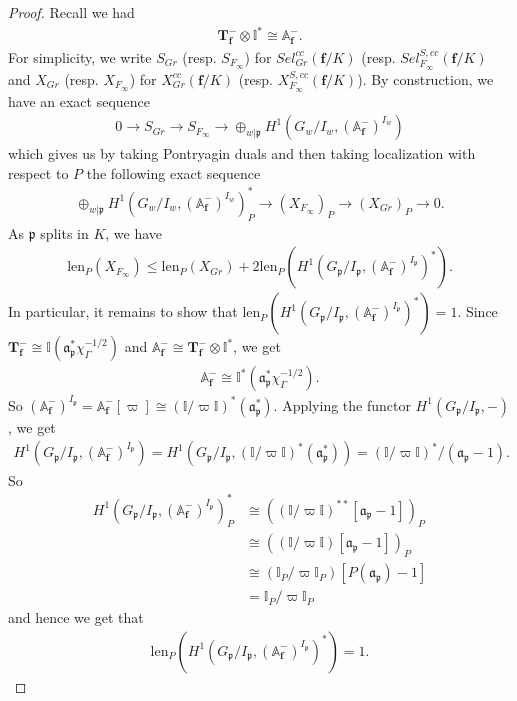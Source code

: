 \documentclass[reqno,10pt]{amsart}
\newcommand{\A}{\mathbb{A}}
\newcommand{\I}{\mathbb{I}}
\newcommand{\f}{\mathbf{f}}
\newcommand{\T}{\mathbf{T}}
\newcommand{\ma}{\mathfrak{a}}
\newcommand{\p}{\mathfrak{p}}
\newcommand{\vp}{\varpi}
\theoremstyle{plain}
\theoremstyle{definition}
\begin{document}
\begin{proof}
    Recall we had 
    \begin{align*}
        \T_\f^- \otimes \I^* \cong \mathbb{A}_\f^-.
    \end{align*}
    For simplicity, we write $S_{Gr}$ (resp. $S_{F_\infty}$) for $Sel^{cc}_{Gr}(\f/K)$ (resp. $Sel^{S,cc}_{F_\infty}(\f/K)$ and $X_{Gr}$ (resp. $X_{F_\infty}$) for $X^{cc}_{Gr}(\f/K)$ (resp. $X^{S,cc}_{F_\infty}(\f/K)$). By construction, we have an exact sequence 
    \begin{align*}
        0 \rightarrow S_{Gr} \rightarrow S_{F_\infty} \rightarrow \oplus_{w|\p} H^1(G_w/I_w,(\A_\f^-)^{I_w})
    \end{align*}
    which gives us by taking Pontryagin duals and then taking localization with respect to $P$ the following exact sequence
    \begin{align*}
        \oplus_{w|\p} H^1(G_w/I_w,(\A_\f^-)^{I_w})^*_P \rightarrow (X_{F_\infty})_P \rightarrow (X_{Gr})_P \rightarrow 0.
    \end{align*}
    As $\p$ splits in $K$, we have
    \begin{align*}
        \mathrm{len}_P(X_{F_\infty}) \leq \mathrm{len}_P(X_{Gr}) + 2\mathrm{len}_P(H^1(G_\p/I_\p,(\A_\f^-)^{I_\p})^*).
    \end{align*}
    In particular, it remains to show that $\mathrm{len}_P(H^1(G_\p/I_\p,(\A_\f^-)^{I_\p})^*) = 1$. 
    Since $\T_\f^- \cong \I(\ma_\p^* \chi_\Gamma^{-1/2})$ and $\A_\f^- \cong \T_\f^- \otimes \I^*$, we get
    \begin{align*}
        \A_\f^- \cong \I^*(\ma_\p^*\chi_\Gamma^{-1/2}).
    \end{align*}
    So $(\A_\f^-)^{I_\p} = \A_\f^-[\vp] \cong (\I/\vp\I)^*(\ma_\p^*)$. Applying the functor $H^1(G_\p/I_\p, -)$, we get
    \begin{align*}
        H^1(G_\p/I_\p,(\A_\f^-)^{I_\p}) = H^1(G_\p/I_\p,(\I/\vp\I)^*(\ma_\p^*)) = (\I/\vp\I)^*/(\ma_\p-1).
    \end{align*}
    So 
    \begin{align*}
        H^1(G_\p/I_\p,(\A_\f^-)^{I_\p})^*_P & \cong ((\I/\vp\I)^{**}[\ma_\p-1])_P \\
        & \cong ((\I/\vp\I)[\ma_\p-1])_P \\
        & \cong (\I_P/\vp\I_P)[P(\ma_\p) - 1] \\
        & = \I_P/\vp\I_P
    \end{align*}
    and hence we get that 
    \begin{align*}
        \mathrm{len}_P(H^1(G_\p/I_\p,(\A_\f^-)^{I_\p})^*) = 1.
    \end{align*}
\end{proof}
\end{document}
